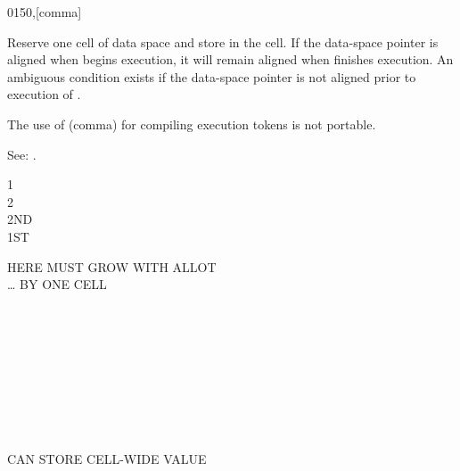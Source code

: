 \vspace*{-4ex}\enlargethispage{8ex}
\begin{worddef}{0150}{,}[comma]
\item {}

	Reserve one cell of data space and store  in the cell.
	If the data-space pointer is aligned when \word{,} begins
	execution, it will remain aligned when \word{,} finishes
	execution. An ambiguous condition exists if the data-space
	pointer is not aligned prior to execution of \word{,}.


	\begin{rationale} %
		The use of \word{,} (comma) for compiling execution tokens is
		not portable.

		See: .
	\end{rationale}

	\begin{testing} %
		\ttfamily
		 1 \word{,} \\
		 2 \word{,} \\
		 2ND \\
		 1ST

		  HERE MUST GROW WITH ALLOT \\
		     {\ldots} BY ONE CELL \\
		 \\
		 \\
		 \\
		 \\
		 \\
		 \\
		 \\
		 \\
		 \\
		 \tab {} CAN STORE CELL-WIDE VALUE
	\end{testing}
\end{worddef}

